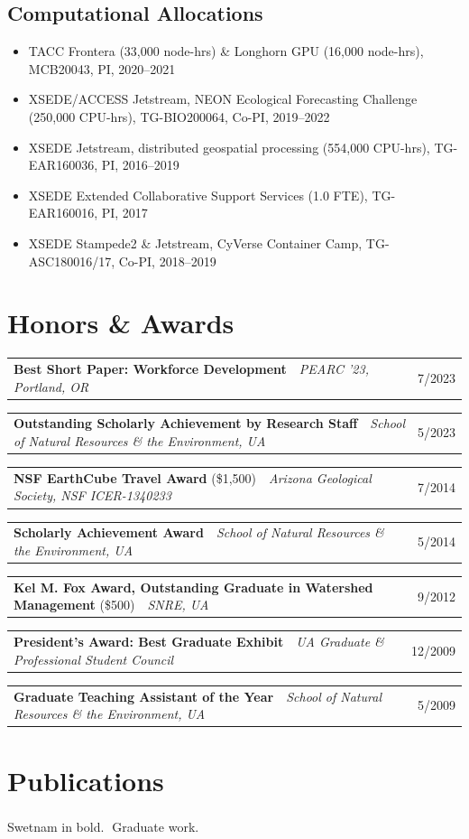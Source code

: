 \documentclass[11pt,letterpaper]{article}
\makeatletter
\newcommand{\dated}[2]{%
  \begin{tabularx}{\linewidth}{@{}X r@{}}
    #1 & {\small #2}
  \end{tabularx}\par\vspace{2pt}}
\newcommand{\grad}{\textsuperscript{\color{muted}\,\dag}}
\newcommand{\note}[1]{{\small\color{muted}#1}}
\makeatother
\begin{document}
\subsection{Computational Allocations}
\begin{itemize}
  \item TACC Frontera (33,000 node-hrs) \& Longhorn GPU (16,000 node-hrs), MCB20043, PI, 2020--2021
  \item XSEDE/ACCESS Jetstream, NEON Ecological Forecasting Challenge (250,000 CPU-hrs), TG-BIO200064, Co-PI, 2019--2022
  \item XSEDE Jetstream, distributed geospatial processing (554,000 CPU-hrs), TG-EAR160036, PI, 2016--2019
  \item XSEDE Extended Collaborative Support Services (1.0 FTE), TG-EAR160016, PI, 2017
  \item XSEDE Stampede2 \& Jetstream, CyVerse Container Camp, TG-ASC180016/17, Co-PI, 2018--2019
\end{itemize}

\section{Honors \& Awards}
\dated{\textbf{Best Short Paper: Workforce Development} \,\textendash\, \textit{PEARC '23, Portland, OR}}{7/2023}
\dated{\textbf{Outstanding Scholarly Achievement by Research Staff} \,\textendash\, \textit{School of Natural Resources \& the Environment, UA}}{5/2023}
\dated{\textbf{NSF EarthCube Travel Award} (\$1,500) \,\textendash\, \textit{Arizona Geological Society, NSF ICER-1340233}}{7/2014}
\dated{\textbf{Scholarly Achievement Award} \,\textendash\, \textit{School of Natural Resources \& the Environment, UA}}{5/2014}
\dated{\textbf{Kel M. Fox Award, Outstanding Graduate in Watershed Management} (\$500) \,\textendash\, \textit{SNRE, UA}}{9/2012}
\dated{\textbf{President's Award: Best Graduate Exhibit} \,\textendash\, \textit{UA Graduate \& Professional Student Council}}{12/2009}
\dated{\textbf{Graduate Teaching Assistant of the Year} \,\textendash\, \textit{School of Natural Resources \& the Environment, UA}}{5/2009}

\section{Publications}
\note{Swetnam in bold. \grad\,Graduate work.}
\end{document}
